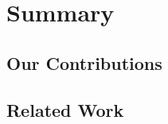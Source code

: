\documentclass[conference,10pt]{IEEEtran}
\begin{document}


\section{Summary}


\subsection{Our Contributions}
\subsection{Related Work}
\end{document}
